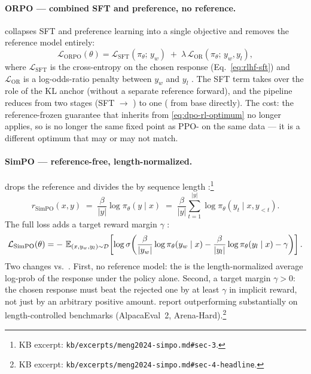 \paragraph{ORPO --- combined SFT and preference, no reference.} 
collapses SFT and preference learning into a single objective and
removes the reference model entirely:
\begin{equation}
\mathcal{L}_{\mathrm{ORPO}}(\theta)
  = \mathcal{L}_{\mathrm{SFT}}(\pi_\theta;\, y_w)
    \;+\; \lambda \, \mathcal{L}_{\mathrm{OR}}(\pi_\theta;\, y_w, y_l),
\label{eq:orpo}
\end{equation}
where $\mathcal{L}_{\mathrm{SFT}}$ is the cross-entropy on the chosen
response (Eq.~\cref{eq:rlhf-sft}) and $\mathcal{L}_{\mathrm{OR}}$ is a
log-odds-ratio penalty between $y_w$ and $y_l$
\citep[Hong et al.\ 2024]{rafailov2023-dpo}.
The SFT term takes over the role of the KL anchor (without a separate
reference forward), and the pipeline reduces from two stages
(SFT $\to$ ) to one ( from base directly). The cost: the
reference-frozen guarantee that  inherits from
\cref{eq:dpo-rl-optimum} no longer applies, so  is no longer the
same fixed point as PPO- on the same data --- it is a different
optimum that may or may not match.

\paragraph{SimPO --- reference-free, length-normalized.}  drops
the reference and divides the  by sequence length
\citep[\S 3]{meng2024-simpo}:\footnote{KB excerpt:
\texttt{kb/excerpts/meng2024-simpo.md\#sec-3}.}
\begin{equation}
r_{\mathrm{SimPO}}(x, y)
  \;=\; \frac{\beta}{|y|} \log \pi_\theta(y \mid x)
  \;=\; \frac{\beta}{|y|} \sum_{t=1}^{|y|} \log \pi_\theta(y_t \mid x, y_{<t}).
\label{eq:simpo-reward}
\end{equation}
The full loss adds a target reward margin $\gamma$
\citep[\S 3, the SimPO loss]{meng2024-simpo}:
\begin{equation}
\mathcal{L}_{\mathrm{SimPO}}(\theta)
  = -\, \operatorname{\mathbb{E}}_{(x, y_w, y_l) \sim \mathcal{D}}
    \!\left[\log \sigma\!\left(
       \frac{\beta}{|y_w|} \log \pi_\theta(y_w \mid x)
       - \frac{\beta}{|y_l|} \log \pi_\theta(y_l \mid x)
       - \gamma
    \right)\right].
\label{eq:simpo-loss}
\end{equation}
Two changes vs.\ . First, no reference model: the 
is the length-normalized average log-prob of the response under the
policy alone. Second, a target margin $\gamma > 0$: the chosen
response must beat the rejected one by at least $\gamma$ in implicit
reward, not just by an arbitrary positive amount. \citet[\S 4]{meng2024-simpo}
report  outperforming  substantially on length-controlled
benchmarks (AlpacaEval~2, Arena-Hard).\footnote{KB excerpt:
\texttt{kb/excerpts/meng2024-simpo.md\#sec-4-headline}.}

